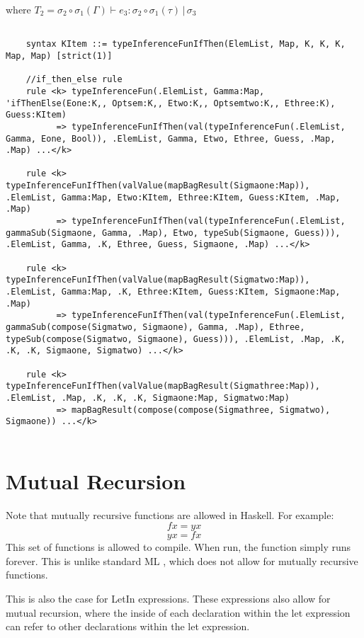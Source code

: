 \noindent
where $T_2 = \sigma_2 \circ \sigma_1(\Gamma) \vdash e_3 : \sigma_2 \circ \sigma_1(\tau) \, | \, \sigma_3$

\begin{lstlisting}

    syntax KItem ::= typeInferenceFunIfThen(ElemList, Map, K, K, K, Map, Map) [strict(1)]

    //if_then_else rule
    rule <k> typeInferenceFun(.ElemList, Gamma:Map, 'ifThenElse(Eone:K,, Optsem:K,, Etwo:K,, Optsemtwo:K,, Ethree:K), Guess:KItem)
          => typeInferenceFunIfThen(val(typeInferenceFun(.ElemList, Gamma, Eone, Bool)), .ElemList, Gamma, Etwo, Ethree, Guess, .Map, .Map) ...</k>

    rule <k> typeInferenceFunIfThen(valValue(mapBagResult(Sigmaone:Map)), .ElemList, Gamma:Map, Etwo:KItem, Ethree:KItem, Guess:KItem, .Map, .Map)
          => typeInferenceFunIfThen(val(typeInferenceFun(.ElemList, gammaSub(Sigmaone, Gamma, .Map), Etwo, typeSub(Sigmaone, Guess))), .ElemList, Gamma, .K, Ethree, Guess, Sigmaone, .Map) ...</k>

    rule <k> typeInferenceFunIfThen(valValue(mapBagResult(Sigmatwo:Map)), .ElemList, Gamma:Map, .K, Ethree:KItem, Guess:KItem, Sigmaone:Map, .Map)
          => typeInferenceFunIfThen(val(typeInferenceFun(.ElemList, gammaSub(compose(Sigmatwo, Sigmaone), Gamma, .Map), Ethree, typeSub(compose(Sigmatwo, Sigmaone), Guess))), .ElemList, .Map, .K, .K, .K, Sigmaone, Sigmatwo) ...</k>

    rule <k> typeInferenceFunIfThen(valValue(mapBagResult(Sigmathree:Map)), .ElemList, .Map, .K, .K, .K, Sigmaone:Map, Sigmatwo:Map)
          => mapBagResult(compose(compose(Sigmathree, Sigmatwo), Sigmaone)) ...</k>
          
\end{lstlisting}

\section{Mutual Recursion}
Note that mutually recursive functions are allowed in Haskell.
For example:
$$
f x = y x
$$
$$
y x = f x
$$
This set of functions is allowed to compile. When run, the function simply runs forever. This is unlike standard ML \cite{Milner90thedefinition}, which does not allow for mutually recursive functions.

This is also the case for LetIn expressions. These expressions also allow for mutual recursion, where the inside of each declaration within the let expression can refer to other declarations within the let expression.

